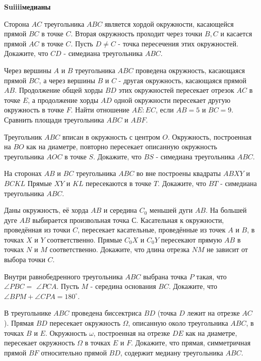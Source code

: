 \centerline{\bf \Huge Suiiiiмедианы}
\centerline{\bf \Huge }

Сторона $A C$ треугольника $A B C$ является хордой окружности, касающейся прямой $B C$ в точке $C$. Вторая окружность проходит через точки $B, C$ и касается прямой $A C$ в точке $C$. Пусть $D \neq C$ - точка пересечения этих окружностей. Докажите, что $C D$ - симедиана треугольника $A B C$.

Через вершины $A$ и $B$ треугольника $A B C$ проведена окружность, касающаяся прямой $B C$, а через вершины $B$ и $C$ - другая окружность, касающаяся прямой $A B$. Продолжение общей хорды $B D$ этих окружностей пересекает отрезок $A C$ в точке $E$, а продолжение хорды $A D$ одной окружности пересекает другую окружность в точке $F$. Найти отношение $A E: E C$, если $A B=5$ и $B C=9$. Сравнить площади треугольника $A B C$ и $A B F$.

Треугольник $A B C$ вписан в окружность с центром $O$. Окружность, построенная на $B O$ как на диаметре, повторно пересекает описанную окружность треугольника $A O C$ в точке $S$. Докажите, что $B S$ - симедиана треугольника $A B C$.

На сторонах $A B$ и $B C$ треугольника $A B C$ во вне построены квадраты $A B X Y$ и $B C K L$ Прямые $X Y$ и $K L$ пересекаются в точке $T$. Докажите, что $B T$ - симедиана треугольника $A B C$.

Даны окружность, её хорда $A B$ и середина $C_0$ меньшей дуги $A B$. На большей дуге $A B$ выбирается произвольная точка С. Касательная к окружности, проведённая из точки $C$, пересекает касательные, проведённые из точек $A$ и $B$, в точках $X$ и $Y$ соответственно. Прямые $C_0 X$ и $C_0 Y$ пересекают прямую $A B$ в точках $N$ и $M$ соответственно. Докажите, что длина отрезка $N M$ не зависит от выбора точки $C$.

Внутри равнобедренного треугольника $A B C$ выбрана точка $P$ такая, что $\angle P B C=$ $\angle P C A$. Пусть $M$ - середина основания $B C$. Докажите, что $\angle B P M+\angle C P A=180^{\circ}$.

В треугольнике $A B C$ проведена биссектриса $B D$ (точка $D$ лежит на отрезке $A C$ ). Прямая $B D$ пересекает окружность $\Omega$, описанную около треугольника $A B C$, в точках $B$ и $E$. Окружность $\omega$, построенная на отрезке $D E$ как на диаметре, пересекает окружность $\Omega$ в точках $E$ и $F$. Докажите, что прямая, симметричная прямой $B F$ относительно прямой $B D$, содержит медиану треугольника $A B C$.